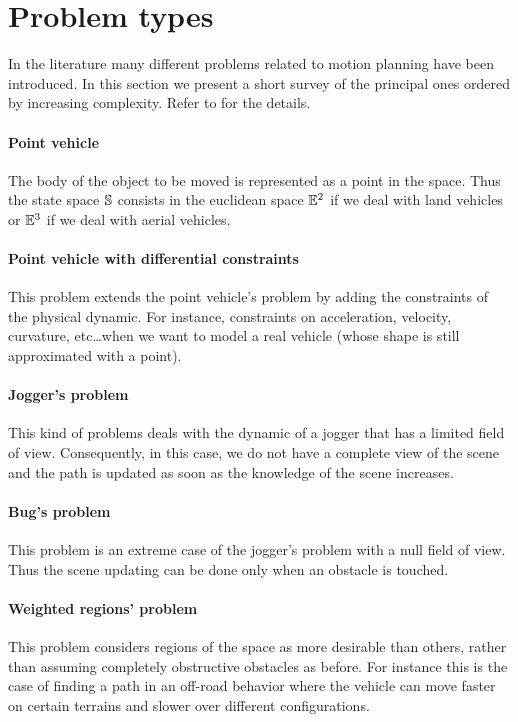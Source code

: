 \documentclass[dissertation.tex]{subfiles}
\begin{document}
\section{Problem types}
In the literature many different problems related to motion
planning have been introduced. In this section we present a short
survey of the principal ones
ordered by increasing complexity. Refer to \cite{goerzen} for the
details.

\paragraph{Point vehicle}
The body of the object to be moved is represented as a
point in the space. Thus the state space $\mathbb{S}$ consists in the euclidean
space $\mathbb{E}^2$ if we deal with land vehicles or $\mathbb{E}^3$ if we deal with
aerial vehicles.

\paragraph{Point vehicle with differential constraints}
This problem extends the point vehicle's problem by adding the
constraints of the physical dynamic. For instance, constraints on
acceleration, velocity, curvature, etc\dots when we want to model a
real vehicle (whose shape is still approximated with a point).

\paragraph{Jogger's problem}
This kind of problems deals with the dynamic of a jogger that has a
limited field of view. Consequently, in this case, we do not have a
complete view of the scene and the path is
updated as soon as the knowledge of the scene increases.

\paragraph{Bug's problem}
This problem is an extreme case of the jogger's problem with a null
field of view. Thus the scene updating can be done only when an
obstacle is touched.

\paragraph{Weighted regions' problem}
This problem considers regions of the space as more desirable than
others, rather than assuming completely obstructive obstacles as
before. For instance this is the case of finding a path in an off-road
behavior where the vehicle can move faster on certain terrains and
slower over different configurations.
\end{document}
